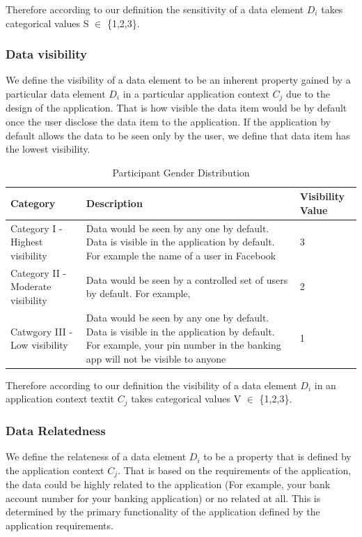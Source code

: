 \documentclass[conference]{IEEEtran}
\begin{document}
Therefore according to our definition the sensitivity of a data element \textit {$D_i$} takes categorical values S $\in$ \{1,2,3\}.

\subsubsection {Data visibility} We define the visibility of a data element to be an inherent property gained by a particular data element \textit{$D_i$} in a particular application context \textit{$C_j$} due to the design of the application. That is how visible the data item would be by default once the user disclose the data item to the application. If the application by default allows the data to be seen only by the user, we define that data item has the lowest visibility.  

\begin{center}
\begin{table}[htbp]
\caption{Participant Gender Distribution}
\begin{center}
\begin{tabular}{|l|l|l|} 
\hline
Category & Description & Visibility Value \\
\hline
Category I - Highest visibility & Data would be seen by any one by default. Data is visible in the application by default. For example the name of a user in Facebook & 3 \\
\hline
Category II - Moderate visibility & Data would be seen by a controlled set of users by default. For example,   & 2 \\
\hline
Catwgory III - Low visibility & Data would be seen by any one by default. Data is visible in the application by default. For example, your pin number in the banking app will not be visible to anyone & 1 \\
\hline
\end{tabular}
\end{center}
\end{table}
\end{center} 

Therefore according to our definition the visibility of a data element \textit {$D_i$} in an application context textit {$C_j$} takes categorical values V $\in$ \{1,2,3\}.

\subsubsection {Data Relatedness} We define the relateness of a data element \textit {$D_i$} to be a property that is defined by the application context \textit {$C_j$}. That is based on the requirements of the application, the data could be highly related to the application (For example, your bank account number for your banking application) or no related at all. This is determined by the primary functionality of the application defined by the application requirements.
\end{document}
